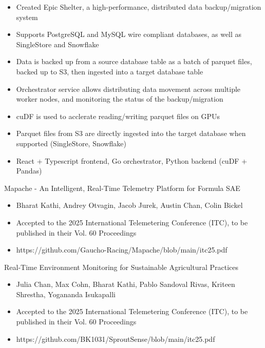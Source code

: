 \documentclass[9pt]{developercv} %
\begin{document}
\begin{entrylist}
{\begin{itemize}[noitemsep,topsep=0pt,parsep=0pt,partopsep=0pt, leftmargin=10pt]
            \item Created Epic Shelter, a high-performance, distributed data backup/migration system
            \item Supports PostgreSQL and MySQL wire compliant databases, as well as SingleStore and Snowflake
            \item Data is backed up from a source database table as a batch of parquet files, backed up to S3, then ingested into a target database table
            \item Orchestrator service allows distributing data movement across multiple worker nodes, and monitoring the status of the backup/migration
            \item cuDF is used to acclerate reading/writing parquet files on GPUs
            \item Parquet files from S3 are directly ingested into the target database when supported (SingleStore, Snowflake)
            \item React + Typescript frontend, Go orchestrator, Python backend (cuDF + Pandas)
        \end{itemize}}
\end{entrylist}
\vspace{-10pt}

\begin{entrylist}
    \entry
		{}
		{Mapache - An Intelligent, Real-Time Telemetry Platform for Formula SAE}
		{}
		{\vspace{-8pt}
        \begin{itemize}[noitemsep,topsep=0pt,parsep=0pt,partopsep=0pt, leftmargin=10pt]
            \item Bharat Kathi, Andrey Otvagin, Jacob Jurek, Austin Chan, Colin Bickel
            \item Accepted to the 2025 International Telemetering Conference (ITC), to be published in their Vol. 60 Proceedings
            \item https://github.com/Gaucho-Racing/Mapache/blob/main/itc25.pdf
        \end{itemize}}
    \entry
		{}
		{Real-Time Environment Monitoring for Sustainable Agricultural Practices}
		{}
		{\vspace{-8pt}
        \begin{itemize}[noitemsep,topsep=0pt,parsep=0pt,partopsep=0pt, leftmargin=10pt]
            \item Julia Chan, Max Cohn, Bharat Kathi, Pablo Sandoval Rivas, Kriteen Shrestha, Yogananda Isukapalli
            \item Accepted to the 2025 International Telemetering Conference (ITC), to be published in their Vol. 60 Proceedings
            \item https://github.com/BK1031/SproutSense/blob/main/itc25.pdf
        \end{itemize}}
\end{entrylist}
\vspace{-10pt}
\end{document}
